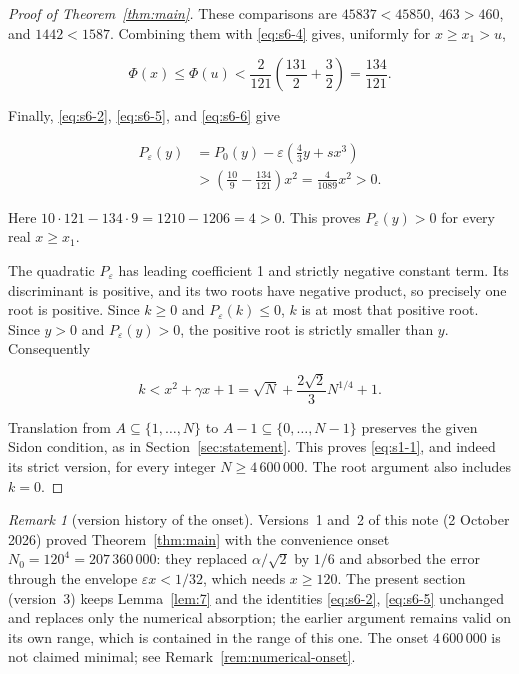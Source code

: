 \documentclass[10pt]{article}
\numberwithin{equation}{section}
\theoremstyle{remark}
\newtheorem{remark}[theorem]{Remark}
\begin{document}
\begin{proof}[Proof of Theorem~\ref{thm:main}]
These comparisons are \(45837<45850\), \(463>460\), and \(1442<1587\).
Combining them with \eqref{eq:s6-4} gives, uniformly for \(x\ge x_1>u\),

\begin{equation}
\Phi(x)\le\Phi(u)
<\frac{2}{121}\left(\frac{131}{2}+\frac32\right)
=\frac{134}{121}.
\label{eq:s6-6}
\end{equation}

Finally, \eqref{eq:s6-2}, \eqref{eq:s6-5}, and \eqref{eq:s6-6} give

\begin{equation}
\begin{aligned}
P_\varepsilon(y)
&=P_0(y)-\varepsilon\left(\frac43y+sx^3\right)\\
&>\left(\frac{10}{9}-\frac{134}{121}\right)x^2
=\frac4{1089}x^2>0.
\end{aligned}
\label{eq:s6-7}
\end{equation}

Here \(10\cdot121-134\cdot9=1210-1206=4>0\). This proves
\(P_\varepsilon(y)>0\) for every real \(x\ge x_1\).

The quadratic \(P_\varepsilon\) has leading coefficient 1 and strictly
negative constant term. Its discriminant is positive, and its two roots
have negative product, so precisely one root is positive. Since \(k\ge0\)
and \(P_\varepsilon(k)\le0\), \(k\) is at most that positive root. Since
\(y>0\) and \(P_\varepsilon(y)>0\), the positive root is strictly smaller
than \(y\). Consequently

\[
k<x^2+\gamma x+1
=\sqrt N+\frac{2\sqrt2}{3}N^{1/4}+1.
\]

Translation from \(A\subseteq\{1,\ldots,N\}\) to
\(A-1\subseteq\{0,\ldots,N-1\}\) preserves the given Sidon condition, as in
Section~\ref{sec:statement}. This proves \eqref{eq:s1-1}, and indeed its
strict version, for every integer \(N\ge4\,600\,000\). The root argument
also includes \(k=0\). \end{proof}

\begin{remark}[version history of the onset]\label{rem:onset-history}
Versions~1 and~2 of this note (2 October 2026) proved
Theorem~\ref{thm:main} with the convenience onset
\(N_0=120^4=207\,360\,000\): they replaced \(\alpha/\sqrt2\) by \(1/6\)
and absorbed the error through the envelope \(\varepsilon x<1/32\), which
needs \(x\ge120\). The present section (version~3) keeps
Lemma~\ref{lem:7} and the identities \eqref{eq:s6-2}, \eqref{eq:s6-5}
unchanged and replaces only the numerical absorption; the earlier
argument remains valid on its own range, which is contained in the range
of this one. The onset \(4\,600\,000\) is not claimed minimal; see
Remark~\ref{rem:numerical-onset}.
\end{remark}
\end{document}
